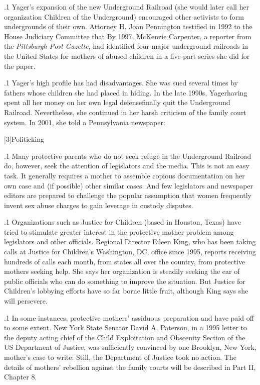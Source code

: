 \documentclass[11pt, twoside]{article}
\begin{document}
{\p.1{%
Yager’s expansion of the new Underground Railroad (she would
later call her organization Children of the Underground) encouraged
other activists to form undergrounds of their own. Attorney H. Joan Pennington testified in 1992 to the House Judiciary Committee that  By 1997, McKenzie Carpenter, a
reporter from the \textit{Pittsburgh Post-Gazette}, had identified four major underground railroads in the United States for mothers of abused children
in a five-part series she did for the paper.
}%

\p.1{%
Yager’s high profile has had disadvantages. She was sued several times
by fathers whose children she had placed in hiding. In the late 1990s,
Yager\mdash{}having spent all her money on her own legal defense\mdash{}finally
quit the Underground Railroad. Nevertheless, she continued in her
harsh criticism of the family court system. In 2001, she told a Pennsylvania newspaper: 
}%


\s|3|{Politicking}

\p.1{%
\noindent{}Many protective parents who do not seek refuge in the Underground
Railroad do, however, seek the attention of legislators and the media.
This is not an easy task. It generally requires a mother to assemble copious documentation on her own case and (if possible) other similar cases.
And few legislators and newspaper editors are prepared to challenge the
popular assumption that women frequently invent sex abuse charges to
gain leverage in custody disputes.
}%

\p.1{%
Organizations such as Justice for Children (based in Houston, Texas)
have tried to stimulate greater interest in the protective mother problem among legislators and other officials. Regional Director Eileen King,
who has been taking calls at Justice for Children’s Washington, DC, office since 1995, reports receiving hundreds of calls each month, from
states all over the country, from protective mothers seeking help. She
says her organization is steadily seeking the ear of public officials who
can do something to improve the situation. But Justice for Children’s
lobbying efforts have so far borne little fruit, although King says she
will persevere.
}%

\p.1{%
In some instances, protective mothers’ assiduous preparation and
 have paid off to some extent. New York State Senator David A. Paterson, in a 1995 letter to the deputy acting chief
of the Child Exploitation and Obscenity Section of the US Department of Justice, was sufficiently convinced by one Brooklyn,
New York, mother’s case to write:  Still,
the Department of Justice took no action. The details of mothers’ rebellion against the family courts will be described in Part II,
Chapter 8.
}%





}
\end{document}
